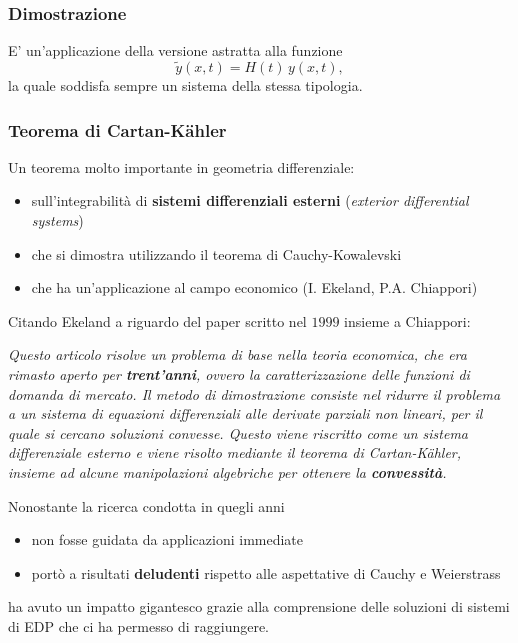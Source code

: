 \documentclass[serif,notheorems]{beamer}
\theoremstyle{definition} %
\theoremstyle{remark}
\begin{document}
\begin{frame}
\frametitle{Dimostrazione}
E' un'applicazione della versione astratta alla funzione $$\widetilde{y}(x,t) = H(t) \, y(x,t),$$ 
la quale soddisfa sempre un sistema della stessa tipologia.
\end{frame}

\begin{frame}
\frametitle{Teorema di Cartan-Kähler}
Un teorema molto importante in geometria differenziale:
\begin{itemize}
\item sull'integrabilità di \textbf{sistemi differenziali esterni} (\textit{exterior differential systems})
\item che si dimostra utilizzando il teorema di Cauchy-Kowalevski
\item che ha un'applicazione al campo economico (I. Ekeland, P.A. Chiappori)
\end{itemize}
\end{frame}

\begin{frame}
Citando Ekeland a riguardo del paper scritto nel $1999$ insieme a Chiappori:\\
\begin{center}
\textit{Questo articolo risolve un problema di base nella teoria economica, che era rimasto aperto per \textbf{trent'anni}, ovvero la caratterizzazione delle funzioni di domanda di mercato. Il metodo di dimostrazione consiste nel ridurre il problema a un sistema di equazioni differenziali alle derivate parziali non lineari, per il quale si cercano soluzioni convesse. Questo viene riscritto come un sistema differenziale esterno e viene risolto mediante il teorema di Cartan-Kähler, insieme ad alcune manipolazioni algebriche per ottenere la \textbf{convessità}.}
\end{center}
\end{frame}

\begin{frame}
Nonostante la ricerca condotta in quegli anni
\begin{itemize}
\item non fosse guidata da applicazioni immediate
\item portò a risultati \textbf{deludenti} rispetto alle aspettative di Cauchy e Weierstrass
\end{itemize}
ha avuto un impatto gigantesco grazie alla comprensione delle soluzioni di sistemi di EDP che ci ha permesso di raggiungere.
\end{frame}
\end{document}
